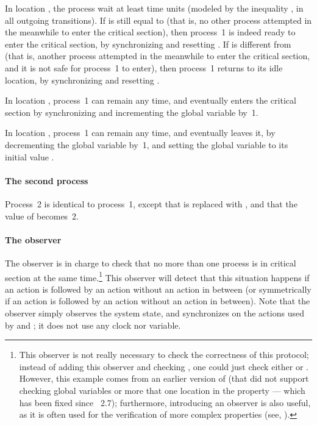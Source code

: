 In location , the process wait at least  time units (modeled by the inequality , in all outgoing transitions).
If  is still equal to  (that is, no other process attempted in the meanwhile to enter the critical section), then process~1 is indeed ready to enter the critical section, by synchronizing  and resetting .
If  is different from  (that is, another process attempted in the meanwhile to enter the critical section, and it is not safe for process~1 to enter), then process~1 returns to its idle location, by synchronizing  and resetting .

In location , process~1 can remain any time, and eventually enters the critical section by synchronizing  and incrementing the global variable  by~1.

In location , process~1 can remain any time, and eventually leaves it, by decrementing the global variable  by~1, and setting the global variable  to its initial value .

\paragraph{The second process}
Process~2 is identical to process~1, except that  is replaced with , and that the value of  becomes~2.


\paragraph{The observer}
The observer is in charge to check that no more than one process is in critical section at the same time.\footnote{%
	This observer is not really necessary to check the correctness of this protocol;
	instead of adding this observer and checking , one could just check either  or .
	However, this example comes from an earlier version of \imitator{} (that did not support checking global variables or more that one location in the  property --- which has been fixed since \imitator{}~2.7); furthermore, introducing an observer is also useful, as it is often used for the verification of more complex properties (see, \eg{} \cite{ABL98,ABBL98,Andre13ICECCS}).
}
This observer will detect that this situation happens if an action  is followed by an action  without an action  in between (or symmetrically if an action  is followed by an action  without an action  in between).
Note that the observer simply observes the system state, and synchronizes on the actions used by  and ; it does not use any clock nor variable.


